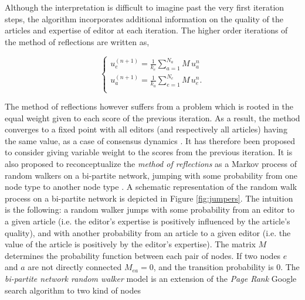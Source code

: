 Although the interpretation is difficult to imagine past the very first iteration steps, the algorithm incorporates additional information on the quality of the articles and expertise of editor at each iteration. The higher order iterations of the method of reflections are written as,

\begin{equation}
\begin{cases}
 u_{e}^{(n+1)} = \frac{1}{k_{e}}\sum_{a=1}^{N_{a}} M \, u_{a}^{n}\\[7pt]
 u_{a}^{(n+1)} = \frac{1}{k_{a}}\sum_{e=1}^{N_{e}} M \, u_{e}^{n}.\\
\end{cases}
\label{HHhigher}
\end{equation}

The method of reflections however suffers from a problem which is rooted in the equal weight given to each score of the previous iteration. As a result, the method converges to a fixed point with all editors (and respectively all articles) having the same value, as a case of consensus dynamics \cite{caldarelli2012network}. It has therefore been proposed to consider giving variable weight to the scores from the previous iteration. It is also proposed to reconceptualize the {\it method of reflections} as a Markov process of random walkers on a bi-partite network, jumping with some probability from one node type to another node type \cite{caldarelli2012network}. A schematic representation of the random walk process on a bi-partite network is depicted in Figure \ref{fig:jumpers}. The intuition is the following: a random walker jumps with some probability from an editor to a given article (i.e. the editor's expertise is positively influenced by the article's quality), and with another probability from an article to a given editor (i.e. the value of the article is positively by the editor's expertise). The matrix $M$ determines the probability function between each pair of nodes. If two nodes $e$ and $a$ are not directly connected $M_{ea} = 0$, and the transition probability is 0. The {\it bi-partite network random walker} model is an extension of the {\it Page Rank} Google search algorithm \cite{page1999pagerank} to two kind of nodes 

